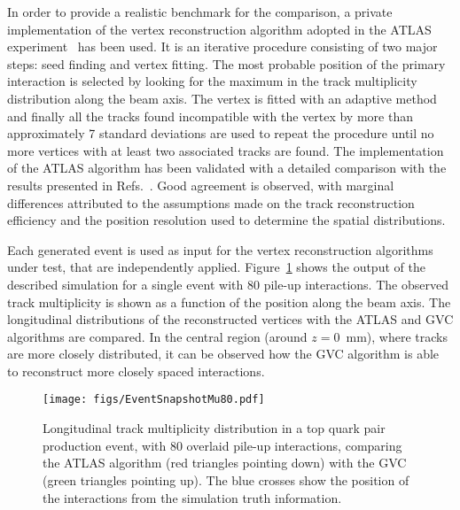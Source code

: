 \documentclass[a4paper,11pt]{article}
\begin{document}
In order to provide a realistic benchmark for the comparison, a private implementation of the vertex reconstruction algorithm adopted in the ATLAS experiment~\cite{Aaboud:2016rmg} has been used. It is an iterative procedure consisting of two major steps: seed finding and vertex fitting. The most probable position of the primary interaction is selected by looking for the maximum in the track multiplicity distribution along the beam axis. The vertex is fitted with an adaptive method and finally all the tracks found incompatible with the vertex by more than approximately 7 standard deviations are used to repeat the procedure until no more vertices with at least two associated tracks are found. The implementation of the ATLAS algorithm has been validated with a detailed comparison with the results presented in Refs.~\cite{Aaboud:2016rmg,ATL-PHYS-PUB-2015-026}. Good agreement is observed, with marginal differences attributed to the assumptions made on the track reconstruction efficiency and the position resolution used to determine the spatial distributions. 

Each generated event is used as input for the vertex reconstruction algorithms under test, that are independently applied. 
Figure~\ref{fig:snapshot80} shows the output of the described simulation for a single event with 80 pile-up interactions. The observed track multiplicity is shown as a function of the position along the beam axis. The longitudinal distributions of the reconstructed vertices with the ATLAS and GVC algorithms are compared. In the central region (around $z = 0$~mm), where tracks are more closely distributed, it can be observed how the GVC algorithm is able to reconstruct more closely spaced interactions. 

\begin{figure}[htb!]
\begin{center}
\texttt{[image: figs/EventSnapshotMu80.pdf]}
\end{center}
\caption{Longitudinal track multiplicity distribution in a top quark pair production event, with 80 overlaid pile-up interactions, comparing the ATLAS algorithm (red triangles pointing down) with the GVC (green triangles pointing up). The blue crosses show the position of the interactions from the simulation truth information.} 
\label{fig:snapshot80}
\end{figure}
\end{document}
